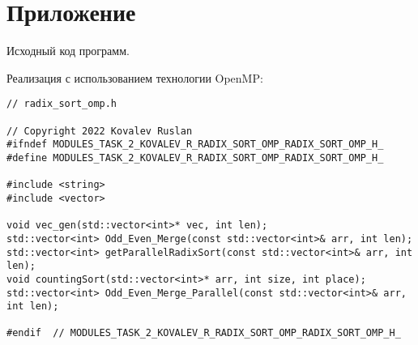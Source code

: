 \documentclass{report}
\begin{document}
\section*{Приложение}
Исходный код программ.
\par Реализация с использованием технологии OpenMP:
\begin{lstlisting}
// radix_sort_omp.h

// Copyright 2022 Kovalev Ruslan
#ifndef MODULES_TASK_2_KOVALEV_R_RADIX_SORT_OMP_RADIX_SORT_OMP_H_
#define MODULES_TASK_2_KOVALEV_R_RADIX_SORT_OMP_RADIX_SORT_OMP_H_

#include <string>
#include <vector>

void vec_gen(std::vector<int>* vec, int len);
std::vector<int> Odd_Even_Merge(const std::vector<int>& arr, int len);
std::vector<int> getParallelRadixSort(const std::vector<int>& arr, int len);
void countingSort(std::vector<int>* arr, int size, int place);
std::vector<int> Odd_Even_Merge_Parallel(const std::vector<int>& arr, int len);

#endif  // MODULES_TASK_2_KOVALEV_R_RADIX_SORT_OMP_RADIX_SORT_OMP_H_


\end{lstlisting}
\end{document}
